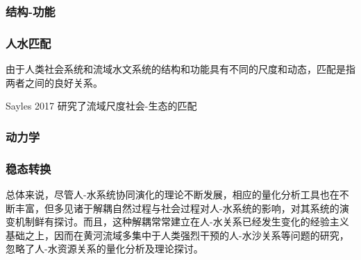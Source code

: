 \subsubsection*{结构-功能}

\subsubsection*{人水匹配}
由于人类社会系统和流域水文系统的结构和功能具有不同的尺度和动态，匹配是指两者之间的良好关系。

Sayles 2017 研究了流域尺度社会-生态的匹配

\subsubsection*{动力学}

\subsubsection*{稳态转换}

总体来说，尽管人-水系统协同演化的理论不断发展，相应的量化分析工具也在不断丰富，但多见诸于解耦自然过程与社会过程对人-水系统的影响，对其系统的演变机制鲜有探讨。而且，这种解耦常常建立在人-水关系已经发生变化的经验主义基础之上，因而在黄河流域多集中于人类强烈干预的人-水沙关系等问题的研究，忽略了人-水资源关系的量化分析及理论探讨。